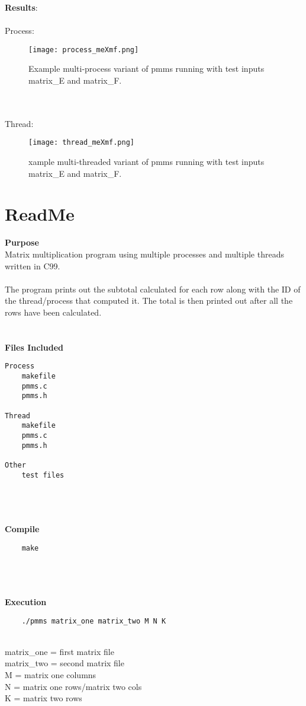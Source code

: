 \documentclass{article}
\begin{document}
\textbf{Results}:
\\\\
Process:
\begin{figure}[!htb]
  \centering
  \texttt{[image: process\_meXmf.png]}
  \caption{Example multi-process variant of pmms running with test inputs
            matrix_E and matrix_F.}
  \label{fig:example}
\end{figure}
\\\\
Thread:
\begin{figure}[!htb]
  \centering
  \texttt{[image: thread\_meXmf.png]}
  \caption{xample multi-threaded variant of pmms running with test inputs
            matrix_E and matrix_F.}
  \label{fig:example}
\end{figure}

\section{ReadMe}
\textbf{Purpose}\\
Matrix multiplication program using multiple processes and multiple threads
written in C99.
\\\\
The program prints out the subtotal calculated for each row along with the ID
of the thread/process that computed it. The total is then printed out after
all the rows have been calculated.
\\\\\\
\textbf{Files Included}
\begin{verbatim}
Process
    makefile
    pmms.c
    pmms.h

Thread
    makefile
    pmms.c
    pmms.h

Other
    test files
\end{verbatim}
\\\\\\
\textbf{Compile}
\begin{verbatim}
    make
\end{verbatim}
\\\\\\
\textbf{Execution}
\begin{verbatim}
    ./pmms matrix_one matrix_two M N K
\end{verbatim}
\\
matrix\_one = first matrix file\\
matrix\_two = second matrix file\\
M = matrix one columns\\
N = matrix one rows/matrix two cols\\
K = matrix two rows\\




\end{document}
